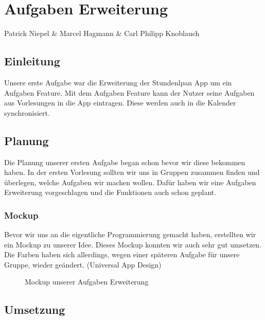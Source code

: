 \chapter{Aufgaben Erweiterung}
Patrick Niepel \& Marcel Hagmann \& Carl Philipp Knoblauch

\section{Einleitung}
Unsere erste Aufgabe war die Erweiterung der Stundenlpan App um ein Aufgaben Feature. Mit dem Aufgaben Feature kann der Nutzer seine Aufgaben aus Vorlesungen in die App eintragen. Diese werden auch in die Kalender synchronisiert.

\newpage
\section{Planung}

Die Planung unserer ersten Aufgabe began schon bevor wir diese bekommen haben. In der ersten Vorlesung sollten wir uns in Gruppen zusammen finden und überlegen, welche Aufgaben wir machen wollen. Dafür haben wir eine Aufgaben Erweiterung vorgeschlagen und die Funktionen auch schon geplant.

\subsection{Mockup}

Bevor wir uns an die eigentliche Programmierung gemacht haben, erstellten wir ein Mockup zu unserer Idee. Dieses Mockup konnten wir auch sehr gut umsetzen. Die Farben haben sich allerdings, wegen einer späteren Aufgabe für unsere Gruppe, wieder geändert. (Universal App Design)


\begin{figure}[ht]
	\centering
	\caption{Mockup unserer Aufgaben Erweiterung}
	\label{fig1}
\end{figure}

\newpage
\section{Umsetzung}
